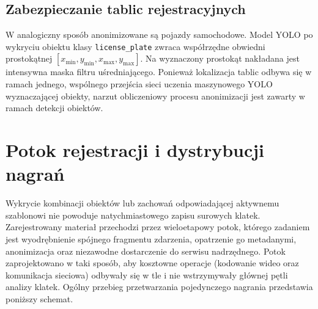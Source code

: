 \subsection{Zabezpieczanie tablic rejestracyjnych}
W analogiczny sposób anonimizowane są pojazdy samochodowe. Model YOLO po wykryciu obiektu klasy \texttt{license\_plate} zwraca współrzędne obwiedni prostokątnej $[x_{\text{min}}, y_{\text{min}}, x_{\text{max}}, y_{\text{max}}]$. Na wyznaczony prostokąt nakładana jest intensywna maska filtru uśredniającego. Ponieważ lokalizacja tablic odbywa się w ramach jednego, wspólnego przejścia sieci uczenia maszynowego YOLO wyznaczającej obiekty, narzut obliczeniowy procesu anonimizacji jest zawarty w ramach detekcji obiektów.

\section{Potok rejestracji i dystrybucji nagrań}\label{sec:detektor_potok}

Wykrycie kombinacji obiektów lub zachowań odpowiadającej aktywnemu szablonowi nie powoduje natychmiastowego zapisu surowych klatek. Zarejestrowany materiał przechodzi przez wieloetapowy potok, którego zadaniem jest wyodrębnienie spójnego fragmentu zdarzenia, opatrzenie go metadanymi, anonimizacja oraz niezawodne dostarczenie do serwisu nadrzędnego. Potok zaprojektowano w taki sposób, aby kosztowne operacje (kodowanie wideo oraz komunikacja sieciowa) odbywały się w tle i nie wstrzymywały głównej pętli analizy klatek. Ogólny przebieg przetwarzania pojedynczego nagrania przedstawia poniższy schemat.

\begin{figure-}
    \centering
    \caption{Potok przetwarzania pojedynczego nagrania: od wykrycia zdarzenia do trwałego zapisu w serwisie nadrzędnym.}\label{fig:potok_glowny}
\end{figure-}

